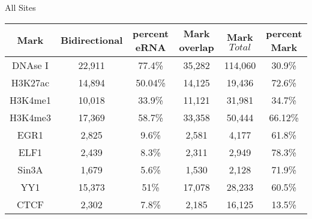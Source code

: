 

All Sites
\\
\begin{center}
\begin{tabular}{  |c|c|c|c|c|c| } 
 \hline
  	Mark & Bidirectional & percent eRNA & Mark overlap & Mark $Total$   & percent Mark \\ 
\hline
  	DNAse I &  22,911  &  77.4\%  &  35,282  & 114,060   & 30.9\%    \\  %
\hline
  	H3K27ac & 14,894 & 50.04\%  &   14,125 &  19,436 &  72.6\%  \\  %
\hline
  	H3K4me1 & 10,018 & 33.9\%  &   11,121 &  31,981 &  34.7\%  \\  %
\hline
  	H3K4me3 & 17,369 & 58.7\%  &   33,358 &  50,444 &  66.12\%  \\  %
\hline
  	EGR1 & 2,825 & 9.6\%  &   2,581 &  4,177 &  61.8\%  \\  %
\hline
  	ELF1 & 2,439 & 8.3\%  &  2,311 &  2,949&  78.3\%  \\  %
\hline
  	Sin3A & 1,679 & 5.6\%  &  1,530 &  2,128&  71.9\%  \\  %
\hline
  	YY1 & 15,373 & 51\%  &  17,078 &  28,233&  60.5\%  \\  %
\hline
  	CTCF & 2,302 & 7.8\%  &  2,185 &  16,125&  13.5\%  \\  %

\hline
\end{tabular}
\end{center}

